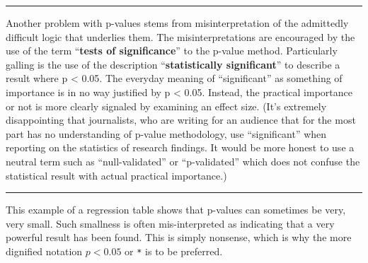 \documentclass[
  letterpaper,
  DIV=11,
  numbers=noendperiod,
  oneside]{scrreprt}
\begin{document}
\begin{center}\rule{0.5\linewidth}{0.5pt}\end{center}

Another problem with p-values stems from misinterpretation of the
admittedly difficult logic that underlies them. The misinterpretations
are encouraged by the use of the term ``\textbf{tests of significance}''
to the p-value method. Particularly galling is the use of the
description ``\textbf{statistically significant}'' to describe a result
where p \textless{} 0.05. The everyday meaning of ``significant'' as
something of importance is in no way justified by p \textless{} 0.05.
Instead, the practical importance or not is more clearly signaled by
examining an effect size. (It's extremely disappointing that
journalists, who are writing for an audience that for the most part has
no understanding of p-value methodology, use ``significant'' when
reporting on the statistics of research findings. It would be more
honest to use a neutral term such as ``null-validated'' or
``p-validated'' which does not confuse the statistical result with
actual practical importance.)

\begin{center}\rule{0.5\linewidth}{0.5pt}\end{center}

This example of a regression table shows that p-values can sometimes be
very, very small. Such smallness is often mis-interpreted as indicating
that a very powerful result has been found. This is simply nonsense,
which is why the more dignified notation \(p < 0.05\) or \texttt{*} is
to be preferred.
\end{document}
